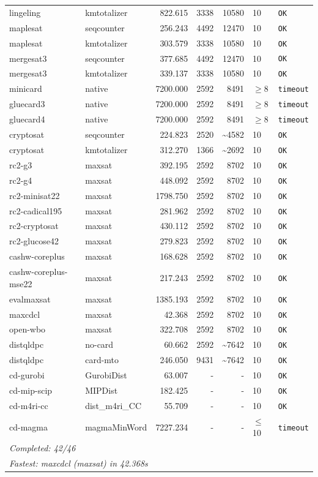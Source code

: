 \begin{longtable}{llrrrl p{}}
lingeling & kmtotalizer & 822.615 & 3338 & 10580 & 10 & \texttt{OK} \\
maplesat & seqcounter & 256.243 & 4492 & 12470 & 10 & \texttt{OK} \\
maplesat & kmtotalizer & 303.579 & 3338 & 10580 & 10 & \texttt{OK} \\
mergesat3 & seqcounter & 377.685 & 4492 & 12470 & 10 & \texttt{OK} \\
mergesat3 & kmtotalizer & 339.137 & 3338 & 10580 & 10 & \texttt{OK} \\
minicard & native & 7200.000 & 2592 & 8491 & $\geq$8 & \texttt{timeout} \\
gluecard3 & native & 7200.000 & 2592 & 8491 & $\geq$8 & \texttt{timeout} \\
gluecard4 & native & 7200.000 & 2592 & 8491 & $\geq$8 & \texttt{timeout} \\
cryptosat & seqcounter & 224.823 & 2520 & \textasciitilde{}4582 & 10 & \texttt{OK} \\
cryptosat & kmtotalizer & 312.270 & 1366 & \textasciitilde{}2692 & 10 & \texttt{OK} \\
rc2-g3 & maxsat & 392.195 & 2592 & 8702 & 10 & \texttt{OK} \\
rc2-g4 & maxsat & 448.092 & 2592 & 8702 & 10 & \texttt{OK} \\
rc2-minisat22 & maxsat & 1798.750 & 2592 & 8702 & 10 & \texttt{OK} \\
rc2-cadical195 & maxsat & 281.962 & 2592 & 8702 & 10 & \texttt{OK} \\
rc2-cryptosat & maxsat & 430.112 & 2592 & 8702 & 10 & \texttt{OK} \\
rc2-glucose42 & maxsat & 279.823 & 2592 & 8702 & 10 & \texttt{OK} \\
cashw-coreplus & maxsat & 168.628 & 2592 & 8702 & 10 & \texttt{OK} \\
cashw-coreplus-mse22 & maxsat & 217.243 & 2592 & 8702 & 10 & \texttt{OK} \\
evalmaxsat & maxsat & 1385.193 & 2592 & 8702 & 10 & \texttt{OK} \\
maxcdcl & maxsat & 42.368 & 2592 & 8702 & 10 & \texttt{OK} \\
open-wbo & maxsat & 322.708 & 2592 & 8702 & 10 & \texttt{OK} \\
distqldpc & no-card & 60.662 & 2592 & \textasciitilde{}7642 & 10 & \texttt{OK} \\
distqldpc & card-mto & 246.050 & 9431 & \textasciitilde{}7642 & 10 & \texttt{OK} \\
cd-gurobi & GurobiDist & 63.007 & - & - & 10 & \texttt{OK} \\
cd-mip-scip & MIPDist & 182.425 & - & - & 10 & \texttt{OK} \\
cd-m4ri-cc & dist\_m4ri\_CC & 55.709 & - & - & 10 & \texttt{OK} \\
cd-magma & magmaMinWord & 7227.234 & - & - & $\leq$10 & \texttt{timeout} \\
\midrule
\multicolumn{7}{l}{\textit{Completed: 42/46}} \\
\multicolumn{7}{l}{\textit{Fastest: maxcdcl (maxsat) in 42.368s}} \\
\end{longtable}
